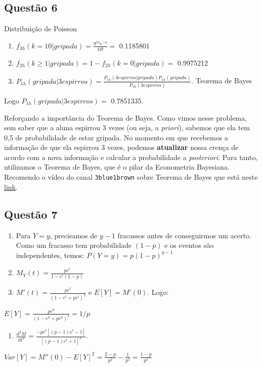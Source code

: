 \documentclass[
]{article}
\providecommand{\tightlist}{%
  \setlength{\itemsep}{0pt}\setlength{\parskip}{0pt}}
\begin{document}
\hypertarget{questuxe3o-6}{%
\subsection{Questão 6}\label{questuxe3o-6}}

Distribuição de Poisson

\begin{enumerate}
\def\labelenumi{\alph{enumi})}
\item
  \(f_{3h}(k=10|gripada)=\frac{9^{10} e^{-9}}{10!}=\) 0.1185801
\item
  \(f_{2h}(k\geq 1|gripada)=1-f_{2h}(k=0|gripada)=\) 0.9975212
\item
  \(P_{1h}(gripada|3 espirros) = \frac{P_{1h}(3 espirros|gripada)P_{1h}(gripada)}{P_{1h}(3 espirros)}\).
  Teorema de Bayes
\end{enumerate}

Logo \(P_{1h}(gripada|3 espirros) =\) 0.7851335.

Reforçando a importância do Teorema de Bayes. Como vimos nesse problema,
sem saber que a aluna espirrou 3 vezes (ou seja, a \emph{priori}),
sabemos que ela tem 0,5 de probabilidade de estar gripada. No momento em
que recebemos a informação de que ela espirrou 3 vezes, podemos
\textbf{atualizar} nossa crença de acordo com a nova informação e
calcular a probabilidade a \emph{posteriori}. Para tanto, utilizamos o
Teorema de Bayes, que é o pilar da Econometria Bayesiana. Recomendo o
vídeo do canal \texttt{3blue1brown} sobre Teorema de Bayes que está
neste \href{https://www.youtube.com/watch?v=HZGCoVF3YvM\&t=471s}{link}.

\hypertarget{questuxe3o-7}{%
\subsection{Questão 7}\label{questuxe3o-7}}

\begin{enumerate}
\def\labelenumi{\alph{enumi})}
\item
  Para \(Y = y\), precisamos de \(y − 1\) fracassos antes de
  conseguirmos um acerto. Como um fracasso tem probabilidade \((1 − p)\)
  e os eventos são independentes, temos: \(P(Y = y) = p(1 − p)^{y−1}\)
\item
  \(M_Y(t)=\frac{pe^t}{1-e^t(1-p)}\)
\item
  \(M'(t)=\frac{pe^t}{(1-e^t+pe^t)^2}\) e \(E[Y]=M'(0)\). Logo:
\end{enumerate}

\(E[Y]=\frac{pe^0}{(1-e^0+pe^0)^2}=1/p\)

\begin{enumerate}
\def\labelenumi{\alph{enumi})}
\setcounter{enumi}{3}
\tightlist
\item
  \(\frac{d^2 M}{d t^2}=\frac{-pe^t[(p-1)e^t-1]}{[(p-1)e^t+1]^3}.\)
\end{enumerate}

\(Var[Y]=M''(0)-E[Y]^2=\frac{2-p}{p^2}-\frac{1}{p^2}=\frac{1-p}{p^2}\)
\end{document}
